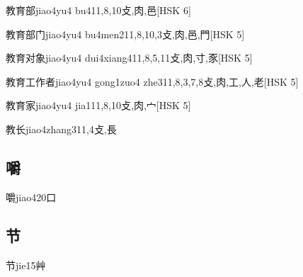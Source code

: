 \begin{EntryWithPhonetic}{教育部}{jiao4yu4 bu4}{11,8,10}{⽁,⾁,⾢}[HSK 6]
\end{EntryWithPhonetic}

\begin{EntryWithPhonetic}{教育部门}{jiao4yu4 bu4men2}{11,8,10,3}{⽁,⾁,⾢,⾨}[HSK 5]
\end{EntryWithPhonetic}

\begin{EntryWithPhonetic}{教育对象}{jiao4yu4 dui4xiang4}{11,8,5,11}{⽁,⾁,⼨,⾗}[HSK 5]
\end{EntryWithPhonetic}

\begin{EntryWithPhonetic}{教育工作者}{jiao4yu4 gong1zuo4 zhe3}{11,8,3,7,8}{⽁,⾁,⼯,⼈,⽼}[HSK 5]
\end{EntryWithPhonetic}

\begin{EntryWithPhonetic}{教育家}{jiao4yu4 jia1}{11,8,10}{⽁,⾁,⼧}[HSK 5]
\end{EntryWithPhonetic}

\begin{EntryWithPhonetic}{教长}{jiao4zhang3}{11,4}{⽁,⾧}
\end{EntryWithPhonetic}

\subsection*{嚼}

\begin{EntryWithPhonetic}{嚼}{jiao4}{20}{⼝}
\end{EntryWithPhonetic}

\subsection*{节}

\begin{EntryWithPhonetic}{节}{jie1}{5}{⾋}
\end{EntryWithPhonetic}

